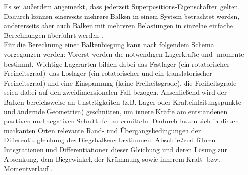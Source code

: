 \noindent Es sei außerdem angemerkt, dass jederzeit Superpositions-Eigenschaften gelten. Dadurch können einerseits mehrere Balken in einem System betrachtet werden, andererseits aber auch Balken mit mehreren Belastungen in einzelne einfache Berechnungen überführt werden \cite{item16}.\\

\noindent Für die Berechnung einer Balkenbiegung kann nach folgendem Schema vorgegangen werden: Vorerst werden die notwendigen Lagerkräfte und -momente bestimmt. Wichtige Lagerarten bilden dabei das Festlager (ein rotatorischer Freiheitsgrad), das Loslager (ein rotatorischer und ein translatorischer Freiheitsgrad) und eine Einspannung (keine Freiheitsgrade), die Freiheitsgrade seien dabei auf den zweidimensionalen Fall bezogen. Anschließend wird der Balken bereichsweise an  Unstetigkeiten (z.B. Lager oder Krafteinleitungspunkte und ändernde Geometrien) geschnitten, um innere Kräfte am entstandenen positiven und negativen Schnittufer zu ermitteln. Dadurch lassen sich in diesen markanten Orten relevante Rand- und Übergangsbedingungen der Differentialgleichung des Biegebalkens bestimmen. Abschließend führen Integrationen und Differentiationen dieser Gleichung und deren Lösung  zur Absenkung, dem Biegewinkel, der Krümmung sowie innerem Kraft- bzw. Momentverlauf \cite{item16}\cite{item9}.
\newpage


